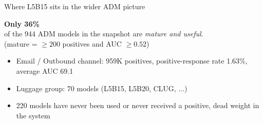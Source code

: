 \documentclass[aspectratio=169,11pt]{beamer}
\begin{document}
\begin{frame}{Where L5B15 sits in the wider ADM picture}
  \begin{center}
    \vspace{0.6em}
    {\fontsize{40}{44}\selectfont\color{accpurple}\textbf{Only 36\%}}\\[0.5em]
    {\large of the 944 ADM models in the snapshot are \emph{mature and useful}.}\\[0.4em]
    \footnotesize\textcolor{accgray}{(mature = $\geq 200$ positives and AUC $\geq 0.52$)}
  \end{center}
  \vspace{1.0em}
  \footnotesize
  \begin{itemize}
    \item Email / Outbound channel: 959K positives, positive-response rate 1.63\%, average AUC 69.1
    \item Luggage group: 70 models (L5B15, L5B20, CLUG, ...)
    \item 220 models have never been used or never received a positive, dead weight in the system
  \end{itemize}
\end{frame}
\end{document}
